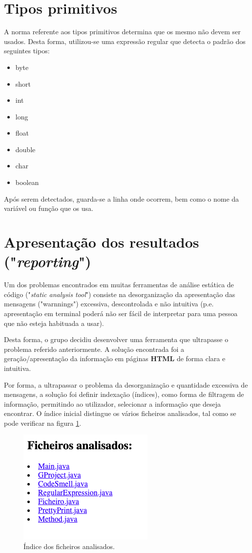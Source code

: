 \section{Tipos primitivos}
\hspace{5mm} A norma referente aos tipos primitivos determina que os mesmo não devem ser usados. Desta forma, utilizou-se uma expressão regular que detecta o padrão dos seguintes tipos:
\begin{itemize}
    \item byte
    \item short
    \item int
    \item long
    \item float
    \item double
    \item char
    \item boolean
\end{itemize}

Após serem detectados, guarda-se a linha onde ocorrem, bem como o nome da variável ou função que os usa.


\section{Apresentação dos resultados ("\textit{reporting}")}

\hspace{5mm} Um dos problemas encontrados em muitas ferramentas de análise estática de código ("\textit{static analysis tool}") consiste na desorganização da apresentação das mensagens ("warnnings") excessiva, descontrolada e não intuitiva (p.e. apresentação em terminal poderá não ser fácil de interpretar para uma pessoa que não esteja habituada a usar).

Desta forma, o grupo decidiu desenvolver uma ferramenta que ultrapasse o problema referido anteriormente. A solução encontrada foi a geração/apresentação da informação em páginas \textbf{HTML} de forma clara e intuitiva.

Por forma, a ultrapassar o problema da desorganização e quantidade excessiva de mensagens, a solução foi definir indexação (índices), como forma de filtragem de informação, permitindo ao utilizador, selecionar a informação que deseja encontrar. O índice inicial distingue os vários ficheiros analisados, tal como se pode verificar na figura \ref{img:indice-ficheiros}.

\begin{figure}[H]
    \centering
    \includegraphics[scale=0.5]{images/indice-ficheiros.png}
    \caption{Índice dos ficheiros analisados.}
    \label{img:indice-ficheiros}
\end{figure}

